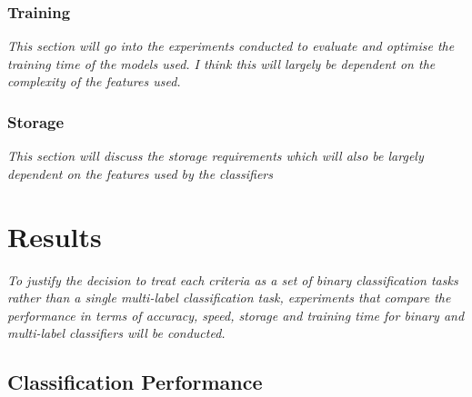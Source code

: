 \documentclass[a4paper,twoside,phd]{BYUPhys}
\begin{document}
\subsection{Training}
\label{sec:TrainingExperiments}
\textit{This section will go into the experiments conducted to evaluate and optimise the training time of the models used. I think this will largely be dependent on the complexity of the features used.}

\subsection{Storage}
\label{sec:StorageExperiments}
\textit{This section will discuss the storage requirements which will also be largely dependent on the features used by the classifiers}



\chapter{Results}
\label{chap:Results}

\textit{To justify the decision to treat each criteria as a set of binary classification tasks rather than a single multi-label classification task, experiments that compare the performance in terms of accuracy, speed, storage and training time for binary and multi-label classifiers will be conducted.}


\section{Classification Performance}
\label{sec:ClassificationPerformance}
\end{document}
